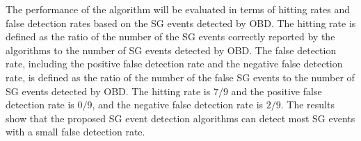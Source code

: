 \documentclass[final,oneside,onecolumn,12pt,a4paper]{book}%
\begin{document}
The performance of the algorithm will be evaluated in terms of
hitting rates and false detection rates based on the SG events detected by
OBD.
The hitting rate is defined as the ratio of the number of the SG events
correctly reported by the algorithms to the number of SG events detected by
OBD. The false detection rate, including the positive false detection rate and
the negative false detection rate, is defined as the ratio of the number of
the false SG events to the number of SG events detected by OBD.
The hitting rate is $7/9$ and the positive false detection rate is $0/9$, and
the negative false detection rate is $2/9$. The results show that the proposed
SG event detection algorithms can detect most SG events with a small false
detection rate.
\end{document}
